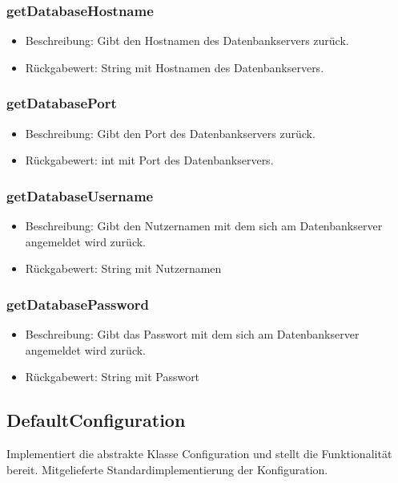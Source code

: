 \documentclass[a4paper]{scrreprt}
\begin{document}
    \subsubsection{getDatabaseHostname}
    \begin{itemize}
        \item Beschreibung: Gibt den Hostnamen des Datenbankservers zurück.
        \item Rückgabewert: String mit Hostnamen des Datenbankservers.
    \end{itemize}

    \subsubsection{getDatabasePort}
    \begin{itemize}
        \item Beschreibung: Gibt den Port des Datenbankservers zurück.
        \item Rückgabewert: int mit Port des Datenbankservers.
    \end{itemize}

    \subsubsection{getDatabaseUsername}
    \begin{itemize}
        \item Beschreibung: Gibt den Nutzernamen mit dem sich am Datenbankserver angemeldet wird zurück.
        \item Rückgabewert: String mit Nutzernamen
    \end{itemize}

    \subsubsection{getDatabasePassword}
    \begin{itemize}
        \item Beschreibung: Gibt das Passwort mit dem sich am Datenbankserver angemeldet wird zurück.
        \item Rückgabewert: String mit Passwort
    \end{itemize}

    \subsection{DefaultConfiguration}
    Implementiert die abstrakte Klasse Configuration und stellt die Funktionalität bereit.
    Mitgelieferte Standardimplementierung der Konfiguration.
\end{document}
